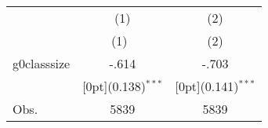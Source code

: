 \begin{tabular*}{\textwidth}{@{\extracolsep{\fill}}lcc}		
	& \multicolumn{1}{c}{(1)} &	\multicolumn{1}{c}{(2)} \\
\cline{2-3}		
	& \multicolumn{1}{c}{(1)\mbox{\ }} &	\multicolumn{1}{c}{(2)} \\
\hline		
g0classsize &	-.614 &	-.703 \\
&	\raisebox{.7ex}[0pt]{\scriptsize (0.138)$^{***}$} &	\raisebox{.7ex}[0pt]{\scriptsize (0.141)$^{***}$} \\
Obs. &	5839 &	5839 \\
\hline\hline		
\end{tabular*}%
